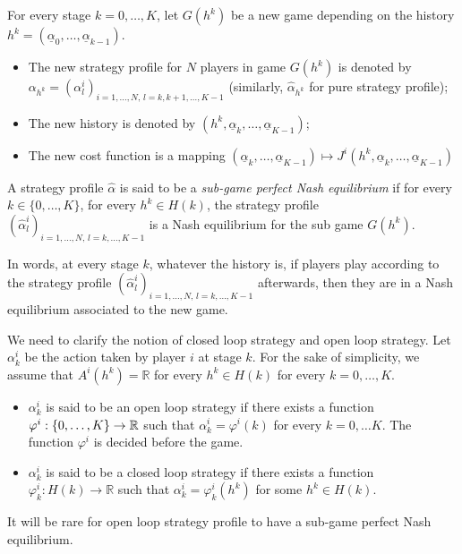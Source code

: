 \begin{definition}
	For every stage $k=0,\ldots,K$, let $G(h^k)$ be a new game depending on the history $h^k=(\underline{\alpha}_0, \ldots, \underline{\alpha}_{k-1})$. 
	\begin{itemize}
		\item The new strategy profile for $N$ players in game $G(h^k)$ is denoted by $\alpha_{h^k} = (\alpha_l^i)_{i=1,\ldots,N, \, l=k, k+1, \ldots, K-1}$ (similarly, $\hat{\alpha}_{h^k}$ for pure strategy profile);
		\item The new history is denoted by $(h^k, \underline{\alpha}_k, \ldots, \underline{\alpha}_{K-1})$;
		\item The new cost function is a mapping $(\underline{\alpha}_k, \ldots, \underline{\alpha}_{K-1}) \mapsto J^i(h^k, \underline{\alpha}_k, \ldots, \underline{\alpha}_{K-1})$
	\end{itemize} 
	A strategy profile $\hat{\alpha}$ is said to be a \textit{sub-game perfect Nash equilibrium} if for every $k\in \{0, \ldots,K\}$, for every $h^k \in H(k)$, the strategy profile $(\hat{\alpha}_l^i)_{i=1,\ldots,N,\, l=k,\ldots,K-1}$ is a Nash equilibrium for the sub game $G(h^k)$.
	
	In words, at every stage $k$, whatever the history is, if players play according to the strategy profile $(\hat{\alpha}_l^i)_{i=1,\ldots,N,\, l=k,\ldots,K-1}$ afterwards, then they are in a Nash equilibrium associated to the new game.
	 
\end{definition}



\begin{remark}
	We need to clarify the notion of closed loop strategy and open loop strategy. Let $\alpha_k^i$ be the action taken by player $i$ at stage $k$. For the sake of simplicity, we assume that $A^i(h^k) = \mathbb{R}$ for every $h^k \in H(k)$ for every $k = 0,\ldots, K$. 	
	\begin{itemize}
		\item $\alpha^i_k$ is said to be an open loop strategy if there exists a function $\varphi^i : \{0,\ldots,K\} \to \mathbb{R}$ such that $\alpha_k^i = \varphi^i(k)$ for every $k= 0, \ldots K$. The function $\varphi^i$ is decided before the game.
		\item $\alpha_k^i$ is said to be a closed loop strategy if there exists a function $\varphi_k^i : H(k) \to \mathbb{R}$ such that $\alpha_k^i = \varphi_k^i(h^k)$ for some $h^k \in H(k)$. 
	\end{itemize} 
	It will be rare for open loop strategy profile to have a sub-game perfect Nash equilibrium.
\end{remark}


